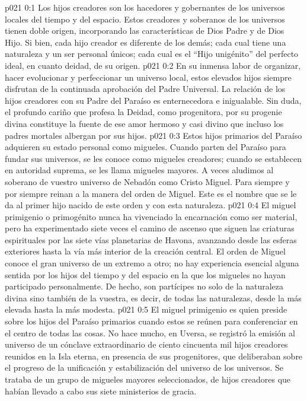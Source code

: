 \author{Perfeccionador de la sabiduría}
\vs p021 0:1 Los hijos creadores son los hacedores y gobernantes de los universos locales del tiempo y del espacio. Estos creadores y soberanos de los universos tienen doble origen, incorporando las características de Dios Padre y de Dios Hijo. Si bien, cada hijo creador es diferente de los demás; cada cual tiene una naturaleza y un ser personal únicos; cada cual es el “Hijo unigénito” del perfecto ideal, en cuanto deidad, de su origen.
\vs p021 0:2 En su inmensa labor de organizar, hacer evolucionar y perfeccionar un universo local, estos elevados hijos siempre disfrutan de la continuada aprobación del Padre Universal. La relación de los hijos creadores con su Padre del Paraíso es enternecedora e inigualable. Sin duda, el profundo cariño que profesa la Deidad, como progenitora, por su progenie divina constituye la fuente de ese amor hermoso y casi divino que incluso los padres mortales albergan por sus hijos.
\vs p021 0:3 Estos hijos primarios del Paraíso adquieren su estado personal como migueles. Cuando parten del Paraíso para fundar sus universos, se les conoce como migueles creadores; cuando se establecen en autoridad suprema, se les llama migueles mayores. A veces aludimos al soberano de vuestro universo de Nebadón como Cristo Miguel. Para siempre y por siempre reinan a la manera del orden de Miguel. Este es el nombre que se le da al primer hijo nacido de este orden y con esta naturaleza.
\vs p021 0:4 \pc El miguel primigenio o primogénito nunca ha vivenciado la encarnación como ser material, pero ha experimentado siete veces el camino de ascenso que siguen las criaturas espirituales por las siete vías planetarias de Havona, avanzando desde las esferas exteriores hasta la vía más interior de la creación central. El orden de Miguel conoce el gran universo de un extremo a otro; no hay experiencia esencial alguna sentida por los hijos del tiempo y del espacio en la que los migueles no hayan participado personalmente. De hecho, son partícipes no solo de la naturaleza divina sino también de la vuestra, es decir, de todas las naturalezas, desde la más elevada hasta la más modesta.
\vs p021 0:5 El miguel primigenio es quien preside sobre los hijos del Paraíso primarios cuando estos se reúnen para conferenciar en el centro de todas las cosas. No hace mucho, en Uversa, se registró la emisión al universo de un cónclave extraordinario de ciento cincuenta mil hijos creadores reunidos en la Isla eterna, en presencia de sus progenitores, que deliberaban sobre el progreso de la unificación y estabilización del universo de los universos. Se trataba de un grupo de migueles mayores seleccionados, de hijos creadores que habían llevado a cabo sus siete ministerios de gracia.
